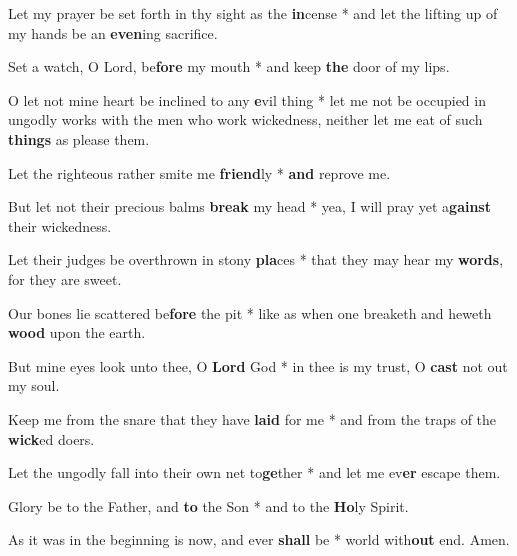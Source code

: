 \begin{multicols}{2}
	Let my prayer be set forth in thy sight as the \textbf{in}cense * and let the lifting up of my hands be an \textbf{even}ing sacrifice.
	
	Set a watch, O Lord, be\textbf{fore} my mouth * and keep \textbf{the} door of my lips.
	
	O let not mine heart be inclined to any \textbf{e}vil thing * let me not be occupied in ungodly works with the men who work wickedness, neither let me eat of such \textbf{things} as please them.
	
	Let the righteous rather smite me \textbf{friend}ly * \textbf{and} reprove me.
	
	But let not their precious balms \textbf{break} my head * yea, I will pray yet a\textbf{gainst} their wickedness.
	
	Let their judges be overthrown in stony \textbf{pla}ces * that they may hear my \textbf{words}, for they are sweet.
	
	Our bones lie scattered be\textbf{fore} the pit * like as when one breaketh and heweth \textbf{wood} upon the earth.
	
	But mine eyes look unto thee, O \textbf{Lord} God * in thee is my trust, O \textbf{cast} not out my soul.
	
	Keep me from the snare that they have \textbf{laid} for me * and from the traps of the \textbf{wick}ed doers.
	
	Let the ungodly fall into their own net to\textbf{ge}ther * and let me ev\textbf{er} escape them.
	
	Glory be to the Father, and \textbf{to} the Son * and to the \textbf{Ho}ly Spirit.
	
	As it was in the beginning is now, and ever \textbf{shall} be * world with\textbf{out} end. Amen.
\end{multicols}